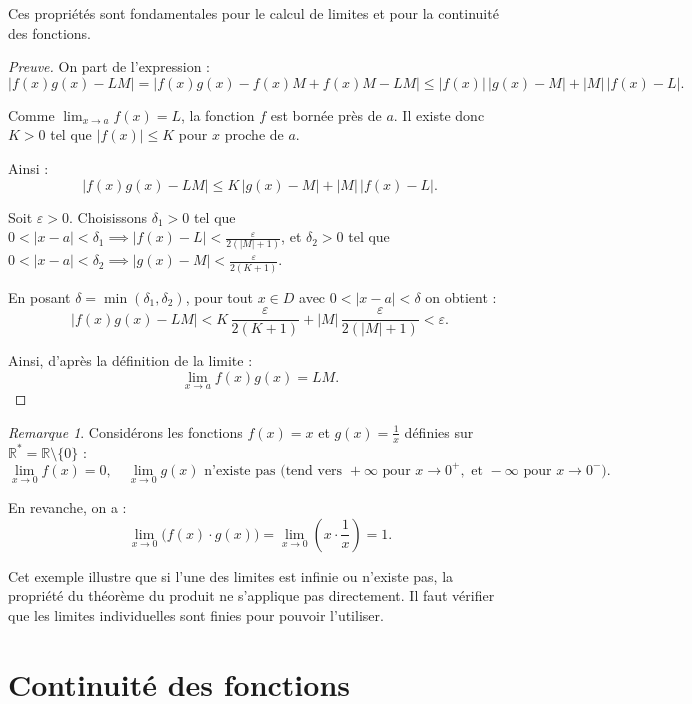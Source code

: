 \documentclass{report} %
\theoremstyle{definition}  %
\theoremstyle{plain} %
\theoremstyle{remark} %
\newtheorem*{remark}{Remarque} %
\begin{document}
\medskip

\noindent
Ces propriétés sont fondamentales pour le calcul de limites et pour la continuité des fonctions.

\medskip

\begin{proof}[Preuve]
On part de l'expression :
\[
|f(x)g(x) - LM| = |f(x)g(x) - f(x)M + f(x)M - LM| \le |f(x)|\,|g(x)-M| + |M|\,|f(x)-L|.
\]

Comme \(\lim_{x \to a} f(x) = L\), la fonction \(f\) est bornée près de \(a\).  
Il existe donc \(K > 0\) tel que \(|f(x)| \le K\) pour \(x\) proche de \(a\).

Ainsi :
\[
|f(x)g(x) - LM| \le K\,|g(x)-M| + |M|\,|f(x)-L|.
\]

Soit \(\varepsilon > 0\).  
Choisissons \(\delta_1 > 0\) tel que \(0 < |x-a| < \delta_1 \implies |f(x)-L| < \frac{\varepsilon}{2(|M|+1)}\), et \(\delta_2 > 0\) tel que \(0 < |x-a| < \delta_2 \implies |g(x)-M| < \frac{\varepsilon}{2(K+1)}\).  

En posant \(\delta = \min(\delta_1, \delta_2)\), pour tout \(x \in D\) avec \(0 < |x-a| < \delta\) on obtient :
\[
|f(x)g(x) - LM| < K\,\frac{\varepsilon}{2(K+1)} + |M|\,\frac{\varepsilon}{2(|M|+1)} < \varepsilon.
\]

Ainsi, d'après la définition de la limite :
\[
\lim_{x \to a} f(x)g(x) = LM.
\]
\end{proof}

\medskip

\begin{remark}
Considérons les fonctions \(f(x) = x\) et \(g(x) = \frac{1}{x}\) définies sur \(\mathbb{R}^* = \mathbb{R} \setminus \{0\}\) :
\[
\lim_{x \to 0} f(x) = 0,
\quad
\lim_{x \to 0} g(x) \text{ n'existe pas (tend vers } +\infty \text{ pour } x \to 0^+, \text{ et } -\infty \text{ pour } x \to 0^-).
\]

En revanche, on a :
\[
\lim_{x \to 0} \bigl(f(x) \cdot g(x)\bigr) = \lim_{x \to 0} \left(x \cdot \frac{1}{x}\right) = 1.
\]

\medskip
\noindent
Cet exemple illustre que si l'une des limites est infinie ou n'existe pas, la propriété du théorème du produit ne s'applique pas directement. Il faut vérifier que les limites individuelles sont finies pour pouvoir l'utiliser.
\end{remark}

\medskip
\section{\textbf{Continuité des fonctions}}
\end{document}
